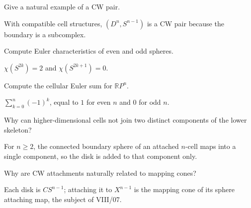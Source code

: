\begin{problem}[CW pair]\label{prob:viii06-16}
Give a natural example of a CW pair.
\end{problem}
\begin{solution}
With compatible cell structures, \((D^n,S^{n-1})\) is a CW pair because the boundary is a subcomplex.
\end{solution}

\begin{problem}\label{prob:viii06-17}
Compute Euler characteristics of even and odd spheres.
\end{problem}
\begin{solution}
\(\chi(S^{2k})=2\) and \(\chi(S^{2k+1})=0\).
\end{solution}

\begin{problem}\label{prob:viii06-18}
Compute the cellular Euler sum for \(\mathbb RP^n\).
\end{problem}
\begin{solution}
\(\sum_{k=0}^n(-1)^k\), equal to \(1\) for even \(n\) and \(0\) for odd \(n\).
\end{solution}

\begin{problem}\label{prob:viii06-19}
Why can higher-dimensional cells not join two distinct components of the lower skeleton?
\end{problem}
\begin{solution}
For \(n\ge2\), the connected boundary sphere of an attached \(n\)-cell maps into a single component, so the disk is added to that component only.
\end{solution}

\begin{problem}\label{prob:viii06-20}
Why are CW attachments naturally related to mapping cones?
\end{problem}
\begin{solution}
Each disk is \(CS^{n-1}\); attaching it to \(X^{n-1}\) is the mapping cone of its sphere attaching map, the subject of VIII/07.
\end{solution}
